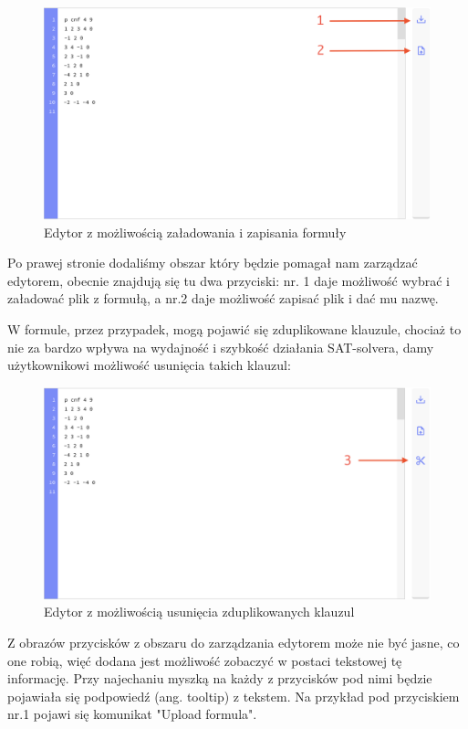 \documentclass[a4paper,12pt,oneside]{book}
\theoremstyle{definition}
\begin{document}
\newpage

\begin{figure}[ht]
    \centering
    \includegraphics[width=14.30cm]{2}
    \caption{Edytor z możliwością załadowania i zapisania formuły}
    \label{fig:2}
\end{figure}

\noindent Po prawej stronie dodaliśmy obszar który będzie pomagał nam zarządzać edytorem, obecnie znajdują się tu dwa przyciski: nr. 1 daje możliwość wybrać i załadować plik z formułą, a nr.2 daje możliwość zapisać plik i dać mu nazwę.

W formule, przez przypadek, mogą pojawić się zduplikowane klauzule, chociaż to nie za bardzo wpływa na wydajność i szybkość działania SAT-solvera, damy użytkownikowi możliwość usunięcia takich klauzul:

\begin{figure}[ht]
    \centering
    \includegraphics[width=14.30cm]{3}
    \caption{Edytor z możliwością usunięcia zduplikowanych klauzul}
    \label{fig:3}
\end{figure}

Z obrazów przycisków z obszaru do zarządzania edytorem może nie być jasne, co one robią, więć dodana jest możliwość zobaczyć w postaci tekstowej tę informację. Przy najechaniu myszką na każdy z przycisków pod nimi będzie pojawiała się podpowiedź (ang. tooltip) z tekstem. Na przykład pod przyciskiem nr.1 pojawi się komunikat "Upload formula".
\end{document}
